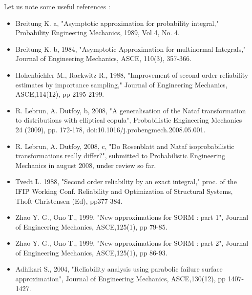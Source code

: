 {  Let us note some useful references :
  \begin{itemize}
  \item Breitung K. a, "Asymptotic approximation for probability integral," Probability Engineering Mechanics, 1989, Vol 4, No. 4.
  \item Breitung K. b, 1984, "Asymptotic Approximation for multinormal Integrals," Journal of Engineering Mechanics, ASCE, 110(3), 357-366.
  \item Hohenbichler M., Rackwitz R., 1988, "Improvement of second order reliability estimates by importance sampling," Journal of Engineering Mechanics, ASCE,114(12), pp 2195-2199.
  \item R. Lebrun, A. Dutfoy, b, 2008, "A generalisation of the Nataf transformation to distributions with elliptical copula", Probabilistic Engineering Mechanics 24 (2009), pp. 172-178, doi:10.1016/j.probengmech.2008.05.001.
  \item R. Lebrun, A. Dutfoy, 2008, c, "Do Rosenblatt and Nataf isoprobabilistic transformations really differ?", submitted to Probabilistic  Engineering Mechanics in august 2008, under review so far.
  \item Tvedt L. 1988, "Second order reliability by an exact integral," proc. of the IFIP Working Conf. Reliability and Optimization of Structural Systems, Thoft-Christensen (Ed), pp377-384.
  \item Zhao Y. G., Ono T., 1999, "New approximations for SORM : part 1", Journal of Engineering Mechanics, ASCE,125(1), pp 79-85.
  \item Zhao Y. G., Ono T., 1999, "New approximations for SORM : part 2", Journal of Engineering Mechanics, ASCE,125(1), pp 86-93.
  \item Adhikari S., 2004, "Reliability analysis using parabolic failure surface approximation", Journal of Engineering Mechanics, ASCE,130(12), pp 1407-1427.
  \end{itemize}
}

